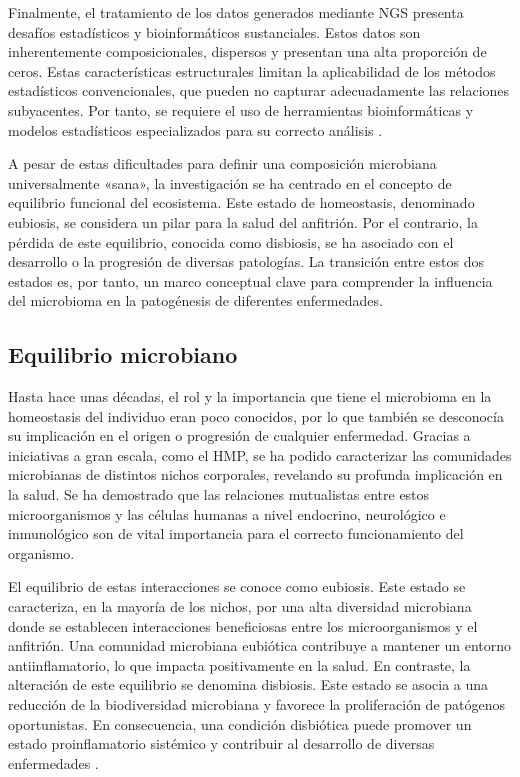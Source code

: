 Finalmente, el tratamiento de los datos generados mediante NGS presenta desafíos estadísticos y bioinformáticos sustanciales. Estos datos son inherentemente composicionales, dispersos y presentan una alta proporción de ceros. Estas características estructurales limitan la aplicabilidad de los métodos estadísticos convencionales, que pueden no capturar adecuadamente las relaciones subyacentes. Por tanto, se requiere el uso de herramientas bioinformáticas y modelos estadísticos especializados para su correcto análisis \cite{gloor2016compositional, pan2021statistical}.



A pesar de estas dificultades para definir una composición microbiana universalmente «sana», la investigación se ha centrado en el concepto de equilibrio funcional del ecosistema. Este estado de homeostasis, denominado eubiosis, se considera un pilar para la salud del anfitrión. Por el contrario, la pérdida de este equilibrio, conocida como disbiosis, se ha asociado con el desarrollo o la progresión de diversas patologías. La transición entre estos dos estados es, por tanto, un marco conceptual clave para comprender la influencia del microbioma en la patogénesis de diferentes enfermedades.


\subsection{Equilibrio microbiano}

Hasta hace unas décadas, el rol y la importancia que tiene el microbioma en la homeostasis del individuo eran poco conocidos, por lo que también se desconocía su implicación en el origen o progresión de cualquier enfermedad. Gracias a iniciativas a gran escala, como el HMP, se ha podido caracterizar las comunidades microbianas de distintos nichos corporales, revelando su profunda implicación en la salud. Se ha demostrado que las relaciones mutualistas entre estos microorganismos y las células humanas a nivel endocrino, neurológico e inmunológico son de vital importancia para el correcto funcionamiento del organismo.

El equilibrio de estas interacciones se conoce como eubiosis. Este estado se caracteriza, en la mayoría de los nichos, por una alta diversidad microbiana donde se establecen interacciones beneficiosas entre los microorganismos y el anfitrión. Una comunidad microbiana eubiótica contribuye a mantener un entorno antiinflamatorio, lo que impacta positivamente en la salud. En contraste, la alteración de este equilibrio se denomina disbiosis. Este estado se asocia a una reducción de la biodiversidad microbiana y favorece la proliferación de patógenos oportunistas. En consecuencia, una condición disbiótica puede promover un estado proinflamatorio sistémico y contribuir al desarrollo de diversas enfermedades \cite{petersen2014defining, gao2015microbiota}.

